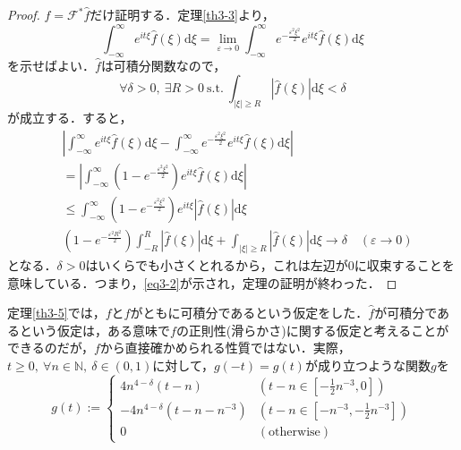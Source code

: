 \documentclass[a4j]{jsbook}
\numberwithin{theorem}{chapter}  %
\begin{document}
\begin{proof}
\(f=\mathcal{F}^*\hat{f}\)だけ証明する．定理\ref{th3-3}より，
\begin{equation}
    \int_{-\infty}^\infty e^{it\xi}\hat{f}(\xi)\mathrm{d}\xi=\lim_{\varepsilon\to 0}\int_{-\infty}^\infty e^{-\frac{\varepsilon^2\xi^2}{2}}e^{it\xi}\hat{f}(\xi)\mathrm{d}\xi \label{eq3-2}
\end{equation}
を示せばよい．\(\hat{f}\)は可積分関数なので，
\begin{equation*}
    \forall\delta>0,\ \exists R>0\ \mathrm{s.t.}\ \int_{|\xi|\geq R}\left|\hat{f}(\xi)\right|\mathrm{d}\xi<\delta
\end{equation*}
が成立する．すると，
\begin{align*}
    &\left|\int_{-\infty}^\infty e^{it\xi}\hat{f}(\xi)\mathrm{d}\xi-\int_{-\infty}^\infty e^{-\frac{\varepsilon^2\xi^2}{2}}e^{it\xi}\hat{f}(\xi)\mathrm{d}\xi\right| \\
    &=\left|\int_{-\infty}^\infty\left(1-e^{-\frac{\varepsilon^2\xi^2}{2}}\right)e^{it\xi}\hat{f}(\xi)\mathrm{d}\xi\right| \\
    &\leq\int_{-\infty}^\infty\left(1-e^{-\frac{\varepsilon^2\xi^2}{2}}\right)e^{it\xi}\left|\hat{f}(\xi)\right|\mathrm{d}\xi \\
    &\left(1-e^{-\frac{\varepsilon^2 R^2}{2}}\right)\int_{-R}^R\left|\hat{f}(\xi)\right|\mathrm{d}\xi+\int_{|\xi|\geq R}\left|\hat{f}(\xi)\right|\mathrm{d}\xi\to\delta\quad(\varepsilon\to 0)
\end{align*}
となる．\(\delta>0\)はいくらでも小さくとれるから，これは左辺が0に収束することを意味している．つまり，\eqref{eq3-2}が示され，定理の証明が終わった．
\end{proof}
定理\ref{th3-5}では，\(f\)と\(\hat{f}\)がともに可積分であるという仮定をした．\(\hat{f}\)が可積分であるという仮定は，ある意味で\(f\)の正則性(滑らかさ)に関する仮定と考えることができるのだが，\(f\)から直接確かめられる性質ではない．実際，\(t\geq 0,\ \forall n\in\mathbb{N},\ \delta\in(0, 1)\)に対して，\(g(-t)=g(t)\)が成り立つような関数\(g\)を
\begin{equation*}
    g(t):=
    \begin{cases}
    4n^{4-\delta}(t-n) & \left(t-n\in\left[-\frac{1}{2}n^{-3}, 0\right]\right) \\
    -4n^{4-\delta}\left(t-n-n^{-3}\right) & \left(t-n\in\left[-n^{-3}, -\frac{1}{2}n^{-3}\right]\right) \\
    0 & (\mathrm{otherwise})
    \end{cases}
\end{equation*}
\end{document}
